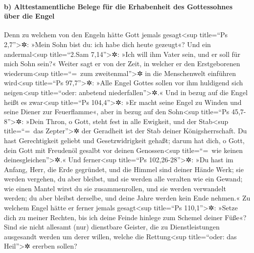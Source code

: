 \hypertarget{b-alttestamentliche-belege-fuxfcr-die-erhabenheit-des-gottessohnes-uxfcber-die-engel}{%
\paragraph{b) Alttestamentliche Belege für die Erhabenheit des
Gottessohnes über die
Engel}\label{b-alttestamentliche-belege-fuxfcr-die-erhabenheit-des-gottessohnes-uxfcber-die-engel}}

 Denn zu welchem von den Engeln hätte Gott jemals
gesagt\textless sup title=``Ps 2,7''\textgreater✲: »Mein Sohn bist du:
ich habe dich heute gezeugt«? Und ein andermal\textless sup
title=``2.Sam 7,14''\textgreater✲: »Ich will ihm Vater sein, und er soll
für mich Sohn sein?«  Weiter sagt er von der Zeit, in
welcher er den Erstgeborenen wiederum\textless sup title=``=~zum
zweitenmal''\textgreater✲ in die Menschenwelt einführen
wird\textless sup title=``Ps 97,7''\textgreater✲: »Alle Engel Gottes
sollen vor ihm huldigend sich neigen\textless sup title=``oder: anbetend
niederfallen''\textgreater✲.«  Und in bezug auf die Engel
heißt es zwar\textless sup title=``Ps 104,4''\textgreater✲: »Er macht
seine Engel zu Winden und seine Diener zur Feuerflamme«, 
aber in bezug auf den Sohn\textless sup title=``Ps
45,7-8''\textgreater✲: »Dein Thron, o Gott, steht fest in alle Ewigkeit,
und der Stab\textless sup title=``=~das Zepter''\textgreater✲ der
Geradheit ist der Stab deiner Königsherrschaft.  Du hast
Gerechtigkeit geliebt und Gesetzwidrigkeit gehaßt; darum hat dich, o
Gott, dein Gott mit Freudenöl gesalbt vor deinen Genossen\textless sup
title=``=~wie keinen deinesgleichen''\textgreater✲.«  Und
ferner\textless sup title=``Ps 102,26-28''\textgreater✲: »Du hast im
Anfang, Herr, die Erde gegründet, und die Himmel sind deiner Hände Werk;
 sie werden vergehen, du aber bleibst, und sie werden
alle veralten wie ein Gewand;  wie einen Mantel wirst du
sie zusammenrollen, und sie werden verwandelt werden; du aber bleibst
derselbe, und deine Jahre werden kein Ende nehmen.«  Zu
welchem Engel hätte er ferner jemals gesagt\textless sup title=``Ps
110,1''\textgreater✲: »Setze dich zu meiner Rechten, bis ich deine
Feinde hinlege zum Schemel deiner Füße«?  Sind sie nicht
allesamt (nur) dienstbare Geister, die zu Dienstleistungen ausgesandt
werden um derer willen, welche die Rettung\textless sup title=``oder:
das Heil''\textgreater✲ ererben sollen?

